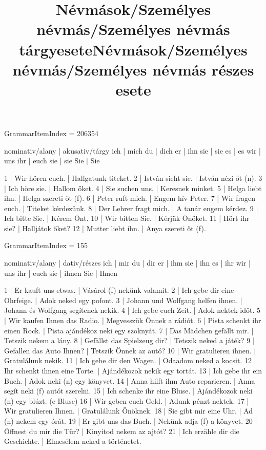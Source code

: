 \title{Névmások/Személyes névmás/Személyes névmás tárgyesete}

GrammarItemIndex = 206354

\begin{desc}
nominativ/alany | akusativ/tárgy
ich             | mich
du              | dich
er              | ihn
sie             | sie
es              | es
wir             | uns
ihr             | euch
sie             | sie
Sie             | Sie
\end{desc}

\begin{exmp}
1 | Wir hören euch. | Hallgatunk titeket.
2 | István sieht sie. | István nézi őt (n).
3 | Ich höre sie. | Hallom őket.
4 | Sie suchen uns. | Keresnek minket.
5 | Helga liebt ihn. | Helga szereti őt (f).
6 | Peter ruft mich. | Engem hív Peter.
7 | Wir fragen euch. | Titeket kérdezünk.
8 | Der Lehrer fragt mich. | A tanár engem kérdez.
9 | Ich bitte Sie. | Kérem Önt.
10 | Wir bitten Sie. | Kérjük Önöket.
11 | Hört ihr sie? | Halljátok őket?
12 | Mutter liebt ihn. | Anya szereti őt (f).
\end{exmp}

\title{Névmások/Személyes névmás/Személyes névmás részes esete}

GrammarItemIndex = 155

\begin{desc}
nominativ/alany | dativ/részes 
ich             | mir 
du              | dir 
er              | ihm 
sie             | ihn
es              | ihr 
wir             | uns 
ihr             | euch 
sie             | ihnen  
Sie             | Ihnen 
\end{desc}

\begin{exmp}
1 | Er kauft uns etwas. | Vásárol (f) nekünk valamit.
2 | Ich gebe dir eine Ohrfeige. | Adok neked egy pofont.
3 | Johann und Wolfgang helfen ihnen. | Johann és Wolfgang segítenek nekik.
4 | Ich gebe euch Zeit. | Adok nektek időt.
5 | Wir kaufen Ihnen das Radio. | Megvesszük Önnek a rádiót.
6 | Pista schenkt ihr einen Rock. | Pista ajándékoz neki egy szoknyát.
7 | Das Mädchen gefällt mir. | Tetszik nekem a lány.
8 | Gefällst das Spielzeug dir? | Tetszik neked a játék?
9 | Gefallen das Auto Ihnen? | Tetszik Önnek az autó?
10 | Wir gratulieren ihnen. | Gratulálunk nekik.
11 | Ich gebe dir den Wagen. | Odaadom neked a kocsit.
12 | Ihr schenkt ihnen eine Torte. | Ajándékozok nekik egy tortát.
13 | Ich gebe ihr ein Buch. | Adok neki (n) egy könyvet.
14 | Anna hilft ihm Auto reparieren. | Anna segít neki (f) autót szerelni.
15 | Ich schenke ihr eine Bluse. | Ajándékozok neki (n) egy blúzt. (e Bluse)
16 | Wir geben euch Geld. | Adunk pénzt nektek.
17 | Wir gratulieren Ihnen. | Gratulálunk Önöknek.
18 | Sie gibt mir eine Uhr. | Ad (n) nekem egy órát.
19 | Er gibt uns das Buch. | Nekünk adja (f) a könyvet.
20 | Öffnest du mir die Tür? | Kinyitod nekem az ajtót?
21 | Ich erzähle dir die Geschichte. | Elmesélem neked a történetet.
\end{exmp}


